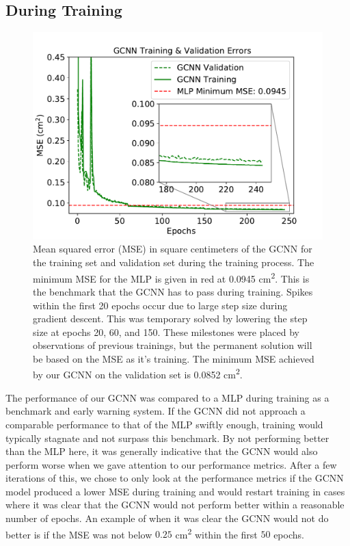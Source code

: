\subsection{During Training}
\begin{figure}[ht]
	\centering
	\includegraphics[width=0.8\linewidth]{figures/del_mse-v-epo_insetted.pdf}
	\caption{Mean squared error (MSE) in square centimeters of the GCNN for the training set and validation set during the training process.
	The minimum MSE for the MLP is given in red at 0.0945 cm\textsuperscript{2}. This is the benchmark that the GCNN has to pass during training.
	Spikes within the first 20 epochs occur due to large step size during gradient descent.
	This was temporary solved by lowering the step size at epochs 20, 60, and 150.
	These milestones were placed by observations of previous trainings, but the permanent solution will be based on the MSE as it's training.
	The minimum MSE achieved by our GCNN on the validation set is 0.0852 cm\textsuperscript{2}.}
	\label{fig:GCNN_Training}
\end{figure}
The performance of our GCNN was compared to a MLP during training as a benchmark and early warning system.
If the GCNN did not approach a comparable performance to that of the MLP swiftly enough, training would typically stagnate and not surpass this benchmark.
By not performing better than the MLP here, it was generally indicative that the GCNN would also perform worse when we gave attention to our performance metrics.
After a few iterations of this, we chose to only look at the performance metrics if the GCNN model produced a lower MSE during training and would restart training in cases where it was clear that the GCNN would not perform better within a reasonable number of epochs.
An example of when it was clear the GCNN would not do better is if the MSE was not below $0.25$ cm\textsuperscript{2} within the first $50$ epochs.
